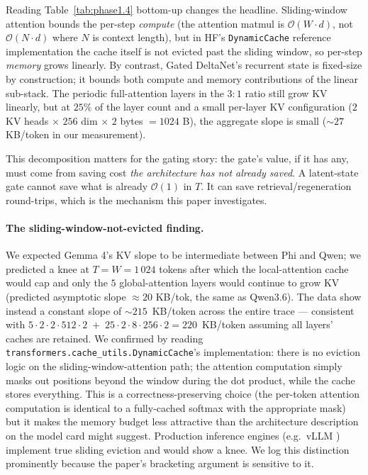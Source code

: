 \documentclass[11pt,letterpaper]{article}
\newcommand{\bigO}{\mathcal{O}}
\begin{document}
Reading Table~\ref{tab:phase1.4} bottom-up changes the headline.
Sliding-window attention bounds the per-step \emph{compute} (the
attention matmul is $\bigO(W \cdot d)$, not $\bigO(N \cdot d)$ where
$N$ is context length), but in HF's \texttt{DynamicCache} reference
implementation the cache itself is not evicted past the sliding window,
so per-step \emph{memory} grows linearly. By contrast, Gated
DeltaNet's recurrent state is fixed-size by construction; it bounds
both compute and memory contributions of the linear sub-stack. The
periodic full-attention layers in the $3{:}1$ ratio still grow KV
linearly, but at $25\%$ of the layer count and a small per-layer KV
configuration ($2$ KV heads $\times$ $256$ dim $\times$ $2$ bytes
$= 1024$ B), the aggregate slope is small ($\sim 27$ KB/token in our
measurement).

This decomposition matters for the gating story: the gate's value, if
it has any, must come from saving cost \emph{the architecture has not
already saved}. A latent-state gate cannot save what is already
$\bigO(1)$ in $T$. It can save retrieval/regeneration round-trips,
which is the mechanism this paper investigates.

\paragraph{The sliding-window-not-evicted finding.}
We expected Gemma 4's KV slope to be intermediate between Phi and
Qwen; we predicted a knee at $T = W = 1\,024$ tokens after which the
local-attention cache would cap and only the $5$ global-attention
layers would continue to grow KV (predicted asymptotic slope $\approx
20$ KB/tok, the same as Qwen3.6). The data show instead a constant
slope of $\sim 215$~KB/token across the entire trace --- consistent
with $5 \cdot 2 \cdot 2 \cdot 512 \cdot 2 \;+\; 25 \cdot 2 \cdot 8
\cdot 256 \cdot 2 = 220$~KB/token assuming all layers' caches are
retained. We confirmed by reading
\texttt{transformers.cache\_utils.DynamicCache}'s implementation: there
is no eviction logic on the sliding-window-attention path; the
attention computation simply masks out positions beyond the window
during the dot product, while the cache stores everything. This is a
correctness-preserving choice (the per-token attention computation is
identical to a fully-cached softmax with the appropriate mask) but it
makes the memory budget less attractive than the architecture
description on the model card might suggest. Production inference
engines (e.g.~vLLM \citep{TODO:vllm}) implement true sliding eviction
and would show a knee. We log this distinction prominently because the
paper's bracketing argument is sensitive to it.
\end{document}
